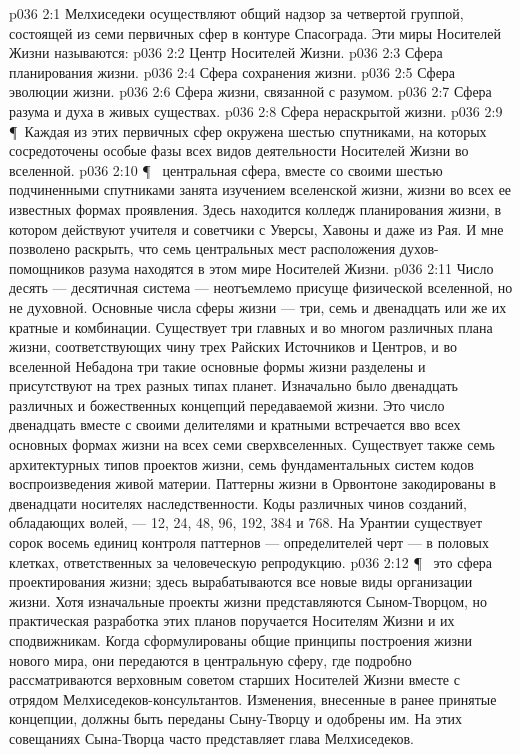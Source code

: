 \vs p036 2:1 Мелхиседеки осуществляют общий надзор за четвертой группой, состоящей из семи первичных сфер в контуре Спасограда. Эти миры Носителей Жизни называются:
\vs p036 2:2 \bibnobreakspace Центр Носителей Жизни.
\vs p036 2:3 \bibnobreakspace Сфера планирования жизни.
\vs p036 2:4 \bibnobreakspace Сфера сохранения жизни.
\vs p036 2:5 \bibnobreakspace Сфера эволюции жизни.
\vs p036 2:6 \bibnobreakspace Сфера жизни, связанной с разумом.
\vs p036 2:7 \bibnobreakspace Сфера разума и духа в живых существах.
\vs p036 2:8 \bibnobreakspace Сфера нераскрытой жизни.
\vs p036 2:9 \P\ Каждая из этих первичных сфер окружена шестью спутниками, на которых сосредоточены особые фазы всех видов деятельности Носителей Жизни во вселенной.
\vs p036 2:10 \P\  центральная сфера, вместе со своими шестью подчиненными спутниками занята изучением вселенской жизни, жизни во всех ее известных формах проявления. Здесь находится колледж планирования жизни, в котором действуют учителя и советчики с Уверсы, Хавоны и даже из Рая. И мне позволено раскрыть, что семь центральных мест расположения духов\hyp{}помощников разума находятся в этом мире Носителей Жизни.
\vs p036 2:11 Число десять --- десятичная система --- неотъемлемо присуще физической вселенной, но не духовной. Основные числа сферы жизни --- три, семь и двенадцать или же их кратные и комбинации. Существует три главных и во многом различных плана жизни, соответствующих чину трех Райских Источников и Центров, и во вселенной Небадона три такие основные формы жизни разделены и присутствуют на трех разных типах планет. Изначально было двенадцать различных и божественных концепций передаваемой жизни. Это число двенадцать вместе с своими делителями и кратными встречается вво всех основных формах жизни на всех семи сверхвселенных. Существует также семь архитектурных типов проектов жизни, семь фундаментальных систем кодов воспроизведения живой материи. Паттерны жизни в Орвонтоне закодированы в двенадцати носителях наследственности. Коды различных чинов созданий, обладающих волей, --- 12, 24, 48, 96, 192, 384 и 768. На Урантии существует сорок восемь единиц контроля паттернов --- определителей черт --- в половых клетках, ответственных за человеческую репродукцию.
\vs p036 2:12 \P\  это сфера проектирования жизни; здесь вырабатываются все новые виды организации жизни. Хотя изначальные проекты жизни представляются Сыном\hyp{}Творцом, но практическая разработка этих планов поручается Носителям Жизни и их сподвижникам. Когда сформулированы общие принципы построения жизни нового мира, они передаются в центральную сферу, где подробно рассматриваются верховным советом старших Носителей Жизни вместе с отрядом Мелхиседеков\hyp{}консультантов. Изменения, внесенные в ранее принятые концепции, должны быть переданы Сыну\hyp{}Творцу и одобрены им. На этих совещаниях Сына\hyp{}Творца часто представляет глава Мелхиседеков.
